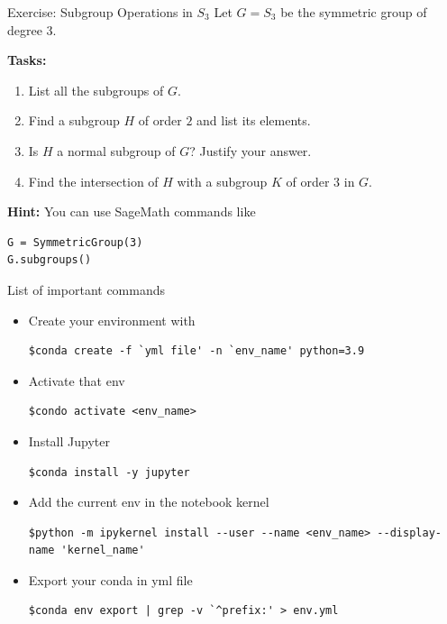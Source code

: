 \documentclass[10pt]{beamer}
\begin{document}
\begin{frame}[fragile]{Exercise: Subgroup Operations in $S_3$}
Let $G = S_3$ be the symmetric group of degree 3.

\textbf{Tasks:}
\begin{enumerate}
\item List all the subgroups of $G$.
\item Find a subgroup $H$ of order $2$ and list its elements.
\item Is $H$ a normal subgroup of $G$? Justify your answer.
\item Find the intersection of $H$ with a subgroup $K$ of order $3$ in $G$.
\end{enumerate}

\vspace{2mm}
\textbf{Hint:} You can use SageMath commands like\\
\vspace{0.5cm}
\begin{lstlisting}[style=mypython]
G = SymmetricGroup(3)
G.subgroups()
\end{lstlisting}
\end{frame}
\begin{frame}[fragile]{List of important commands}
\begin{itemize}
\item Create your environment with
\begin{lstlisting}[style=advancedshell]
$conda create -f `yml file' -n `env_name' python=3.9 
\end{lstlisting}

\item Activate that env
\begin{lstlisting}[style=advancedshell]
$condo activate <env_name>
\end{lstlisting}
\item Install Jupyter
\begin{lstlisting}[style=advancedshell]
$conda install -y jupyter  
\end{lstlisting}
\item Add the current env in the notebook kernel
\begin{lstlisting}[style=advancedshell]
$python -m ipykernel install --user --name <env_name> --display-name 'kernel_name'
\end{lstlisting}
\item Export your conda in yml file 
\begin{lstlisting}[style=advancedshell]
$conda env export | grep -v `^prefix:' > env.yml  
\end{lstlisting}
\end{itemize}
\end{frame}
\end{document}
